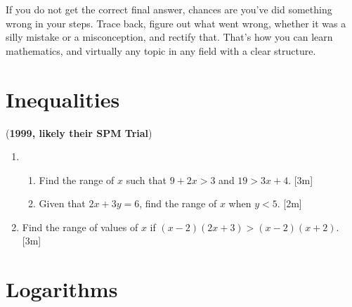 \documentclass[notoc,notitlepage]{tufte-book}
\begin{document}
If you do not get the correct final answer, chances are you've did something
wrong in your steps. Trace back, figure out what went wrong, whether it was a
silly mistake or a misconception, and rectify that. That's how you can learn
mathematics, and virtually any topic in any field with a clear structure.


\chapter{Inequalities}%
\label{chp:inequalities}

(\textbf{1999, likely their SPM Trial})
\begin{enumerate}
  \item \begin{enumerate}
      \item Find the range of $x$ such that $9 + 2x > 3$ and $19 > 3x + 4$. [3m]
      \item Given that $2x + 3y = 6$, find the range of $x$ when $y < 5$. [2m]
    \end{enumerate}

  \item Find the range of values of $x$ if $(x - 2)(2x + 3) > (x - 2)(x +
    2)$. [3m]

\end{enumerate}


\chapter{Logarithms}%
\label{chp:logarithms}
\end{document}
